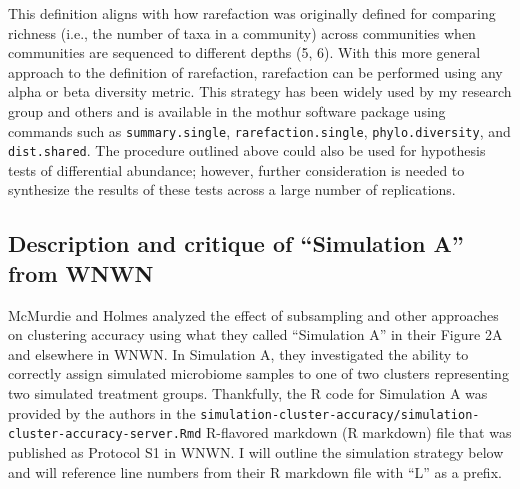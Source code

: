 \documentclass[
]{article}
\begin{document}
This definition aligns with how rarefaction was originally defined for
comparing richness (i.e., the number of taxa in a community) across
communities when communities are sequenced to different depths (5, 6).
With this more general approach to the definition of rarefaction,
rarefaction can be performed using any alpha or beta diversity metric.
This strategy has been widely used by my research group and others and
is available in the mothur software package using commands such as
\texttt{summary.single}, \texttt{rarefaction.single},
\texttt{phylo.diversity}, and \texttt{dist.shared}. The procedure
outlined above could also be used for hypothesis tests of differential
abundance; however, further consideration is needed to synthesize the
results of these tests across a large number of replications.

\hypertarget{description-and-critique-of-simulation-a-from-wnwn}{%
\subsection{Description and critique of ``Simulation A'' from
WNWN}\label{description-and-critique-of-simulation-a-from-wnwn}}

McMurdie and Holmes analyzed the effect of subsampling and other
approaches on clustering accuracy using what they called ``Simulation
A'' in their Figure 2A and elsewhere in WNWN. In Simulation A, they
investigated the ability to correctly assign simulated microbiome
samples to one of two clusters representing two simulated treatment
groups. Thankfully, the R code for Simulation A was provided by the
authors in the
\texttt{simulation-cluster-accuracy/simulation-cluster-accuracy-server.Rmd}
R-flavored markdown (R markdown) file that was published as Protocol S1
in WNWN. I will outline the simulation strategy below and will reference
line numbers from their R markdown file with ``L'' as a prefix.
\end{document}
